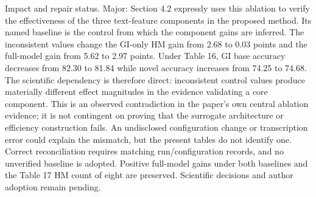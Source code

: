 \documentclass[10pt]{article}
\begin{document}
Impact and repair status. Major: Section 4.2 expressly uses this ablation to verify the effectiveness of the three text-feature components in the proposed method. Its named baseline is the control from which the component gains are inferred. The inconsistent values change the GI-only HM gain from 2.68 to 0.03 points and the full-model gain from 5.62 to 2.97 points. Under Table 16, GI base accuracy decreases from 82.30 to 81.84 while novel accuracy increases from 74.25 to 74.68. The scientific dependency is therefore direct: inconsistent control values produce materially different effect magnitudes in the evidence validating a core component. This is an observed contradiction in the paper’s own central ablation evidence; it is not contingent on proving that the surrogate architecture or efficiency construction fails. An undisclosed configuration change or transcription error could explain the mismatch, but the present tables do not identify one. Correct reconciliation requires matching run/configuration records, and no unverified baseline is adopted. Positive full-model gains under both baselines and the Table 17 HM count of eight are preserved. Scientific decisions and author adoption remain pending.\par
\end{document}
